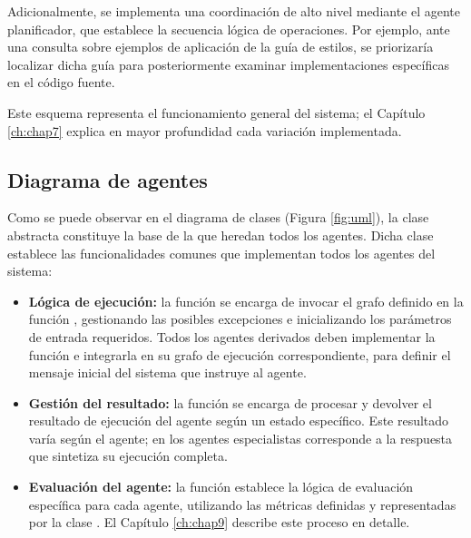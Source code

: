 Adicionalmente, se implementa una coordinación de alto nivel mediante el agente planificador, que establece la secuencia lógica de operaciones. Por ejemplo, ante una consulta sobre ejemplos de aplicación de la guía de estilos, se priorizaría localizar dicha guía para posteriormente examinar implementaciones específicas en el código fuente.

Este esquema representa el funcionamiento general del sistema; el Capítulo \ref{ch:chap7} explica en mayor profundidad cada variación implementada.

\subsection{Diagrama de agentes}

Como se puede observar en el diagrama de clases (Figura \ref{fig:uml}), la clase abstracta  constituye la base de la que heredan todos los agentes. Dicha clase establece las funcionalidades comunes que implementan todos los agentes del sistema:

\begin{itemize}
\item \textbf{Lógica de ejecución:} la función  se encarga de invocar el grafo definido en la función , gestionando las posibles excepciones e inicializando los parámetros de entrada requeridos. Todos los agentes derivados deben implementar la función  e integrarla en su grafo de ejecución correspondiente, para definir el mensaje inicial del sistema que instruye al agente.
\item \textbf{Gestión del resultado:} la función  se encarga de procesar y devolver el resultado de ejecución del agente según un estado específico. Este resultado varía según el agente; en los agentes especialistas corresponde a la respuesta que sintetiza su ejecución completa.
\item \textbf{Evaluación del agente:} la función  establece la lógica de evaluación específica para cada agente, utilizando las métricas definidas y representadas por la clase . El Capítulo \ref{ch:chap9} describe este proceso en detalle.
\end{itemize}

